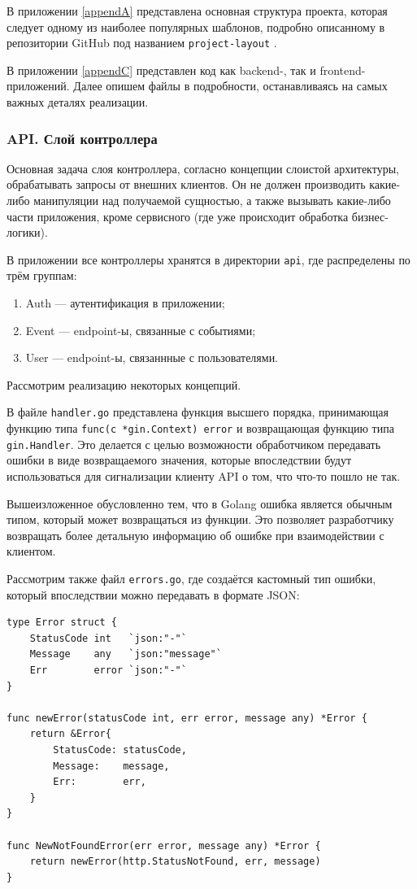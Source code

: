 \documentclass[diploma]{SCWorks}
\begin{document}
В приложении \ref{appendA} представлена основная 
структура проекта, которая следует одному из наиболее популярных шаблонов, 
подробно описанному в репозитории GitHub под названием \texttt{project-layout} 
\cite{go-project-layout}.

В приложении \ref{appendC} представлен код как backend-, так и 
frontend-приложений. Далее опишем файлы в подробности, останавливаясь на самых 
важных деталях реализации.

\subsubsection{API. Слой контроллера}

Основная задача слоя контроллера, согласно концепции слоистой архитектуры,
обрабатывать запросы от внешних клиентов. Он не должен производить какие-либо 
манипуляции над получаемой сущностью, а также вызывать какие-либо части 
приложения, кроме сервисного (где уже происходит обработка бизнес-логики).

В приложении все контроллеры хранятся в директории \texttt{api}, где 
распределены по трём группам:
\begin{enumerate}
    \item Auth — аутентификация в приложении;
    \item Event — endpoint-ы, связанные с событиями;
    \item User — endpoint-ы, связаннные с пользователями.
\end{enumerate}

Рассмотрим реализацию некоторых концепций.

В файле \texttt{handler.go} представлена функция высшего порядка, принимающая
функцию типа \texttt{func(c *gin.Context) error} и возвращающая функцию типа
\texttt{gin.Handler}. Это делается с целью возможности обработчиком передавать
ошибки в виде возвращаемого значения, которые впоследствии будут использоваться
для сигнализации клиенту API о том, что что-то пошло не так.

Вышеизложенное обусловленно тем, что в Golang ошибка является обычным типом,
который может возвращаться из функции. Это позволяет разработчику возвращать 
более детальную информацию об ошибке при взаимодействии с клиентом.

Рассмотрим также файл \texttt{errors.go}, где создаётся кастомный тип ошибки,
который впоследствии можно передавать в формате JSON:

\begin{verbatim}
type Error struct {
    StatusCode int   `json:"-"`
    Message    any   `json:"message"`
    Err        error `json:"-"`
}

func newError(statusCode int, err error, message any) *Error {
    return &Error{
        StatusCode: statusCode,
        Message:    message,
        Err:        err,
    }
}

func NewNotFoundError(err error, message any) *Error {
    return newError(http.StatusNotFound, err, message)
}
\end{verbatim}
\end{document}
